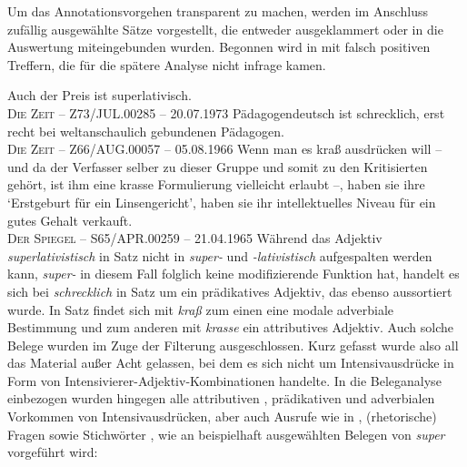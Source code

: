 Um das Annotationsvorgehen transparent zu machen, werden im Anschluss zufällig ausgewählte Sätze vorgestellt, die entweder ausgeklammert oder in die Auswertung miteingebunden wurden. Begonnen wird in  mit falsch positiven Treffern, die für die spätere Analyse nicht infrage kamen.

\largerpage
\ea \label{ausschluss}
\ea Auch der Preis ist superlativisch. \\   	\label{preis}
\textsc{Die Zeit} -- Z73/JUL.00285 -- 20.07.1973
\ex Pädagogendeutsch ist schrecklich, erst recht bei weltanschaulich gebundenen Pädagogen.  \\   \label{päd}
\textsc{Die Zeit} -- Z66/AUG.00057 -- 05.08.1966
\ex Wenn man es kraß ausdrücken will -- und da der Verfasser selber zu dieser Gruppe und somit zu den Kritisierten gehört, ist ihm eine krasse Formulierung vielleicht erlaubt --, haben sie ihre `Erstgeburt für ein Linsengericht', haben sie ihr intellektuelles Niveau für ein gutes Gehalt verkauft. \\  \label{krasse}
\textsc{Der Spiegel} -- S65/APR.00259 -- 21.04.1965
\z
\z
Während das Adjektiv \textit{superlativistisch} in Satz  nicht in \textit{super-} und \textit{-lativistisch} aufgespalten werden kann, \textit{super-} in diesem Fall folglich keine modifizierende Funktion hat, handelt es sich bei \textit{schrecklich} in Satz  um ein prädikatives Adjektiv, das ebenso aussortiert wurde. In Satz  findet sich mit \textit{kraß} zum einen eine modale adverbiale Bestimmung und zum anderen mit \textit{krasse} ein attributives Adjektiv. Auch solche Belege wurden im Zuge der Filterung ausgeschlossen. Kurz gefasst wurde also all das Material außer Acht gelassen, bei dem es sich nicht um Intensivausdrücke in Form von Intensivierer-Adjektiv-Kombinationen handelte. In die Beleganalyse einbezogen wurden hingegen alle attributiven , prädikativen  und adverbialen Vorkommen  von Intensivausdrücken, aber auch Ausrufe wie in , (rhetorische) Fragen  sowie Stichwörter , wie an beispielhaft ausgewählten Belegen von \textit{super} vorgeführt wird:


